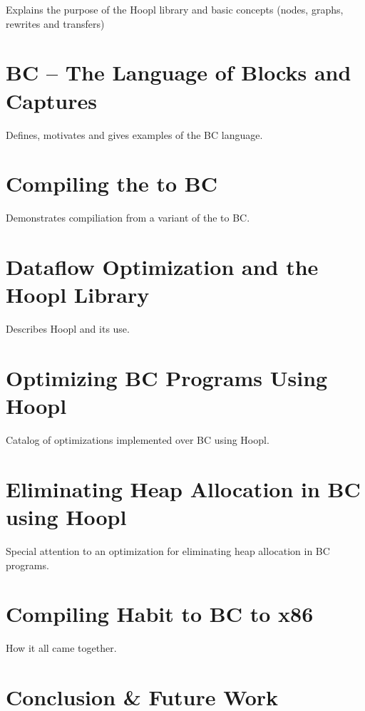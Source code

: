 \documentclass[11pt]{article}
\begin{document}
Explains the purpose of the Hoopl library and basic concepts (nodes,
graphs, rewrites and transfers)

\section{BC -- The Language of Blocks and Captures}

Defines, motivates and gives examples of the BC language.

\section{Compiling the \lamA to BC}

Demonstrates compiliation from a variant of the \lamA to BC. 

\section{Dataflow Optimization and the Hoopl Library}

Describes Hoopl and its use.

\section{Optimizing BC Programs Using Hoopl}

Catalog of optimizations implemented over BC using Hoopl.

\section{Eliminating Heap Allocation in BC using Hoopl}

Special attention to an optimization for eliminating heap allocation
in BC programs.

\section{Compiling Habit to BC to x86}

How it all came together.

\section{Conclusion \& Future Work}
\end{document}

